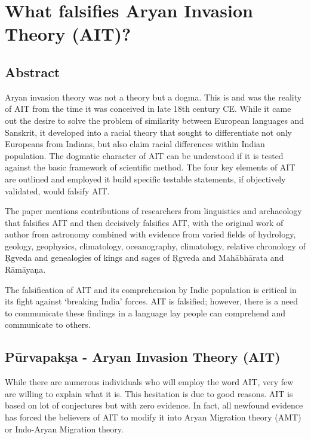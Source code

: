 
\chapter{What falsifies Aryan Invasion Theory (AIT)?}\label{intro}



\section*{Abstract}

Aryan invasion theory was not a theory but a dogma. This is and was the reality of AIT from the time it was conceived in late 18th century CE. While it came out the desire to solve the problem of similarity between European languages and Sanskrit, it developed into a racial theory that sought to differentiate not only Europeans from Indians, but also claim racial differences within Indian population. The dogmatic character of AIT can be understood if it is tested against the basic framework of scientific method. The four key elements of AIT are outlined and employed it build specific testable statements, if objectively validated, would falsify AIT.

The paper mentions contributions of researchers from linguistics and archaeology that falsifies AIT and then decisively falsifies AIT, with the original work of author from astronomy combined with evidence from varied fields of hydrology, geology, geophysics, climatology, oceanography, climatology, relative chronology of Ṛgveda and genealogies of kings and sages of Ṛgveda and Mahābhārata and Rāmāyaņa.

The falsification of AIT and its comprehension by Indic population is critical in its fight against ‘breaking India’ forces. AIT is falsified; however, there is a need to communicate these findings in a language lay people can comprehend and communicate to others.


\section*{Pūrvapakṣa - Aryan Invasion Theory (AIT)}

While there are numerous individuals who will employ the word AIT, very few are willing to explain what it is. This hesitation is due to good reasons. AIT is based on lot of conjectures but with zero evidence. In fact, all newfound evidence has forced the believers of AIT to modify it into Aryan Migration theory (AMT) or Indo-Aryan Migration theory.

